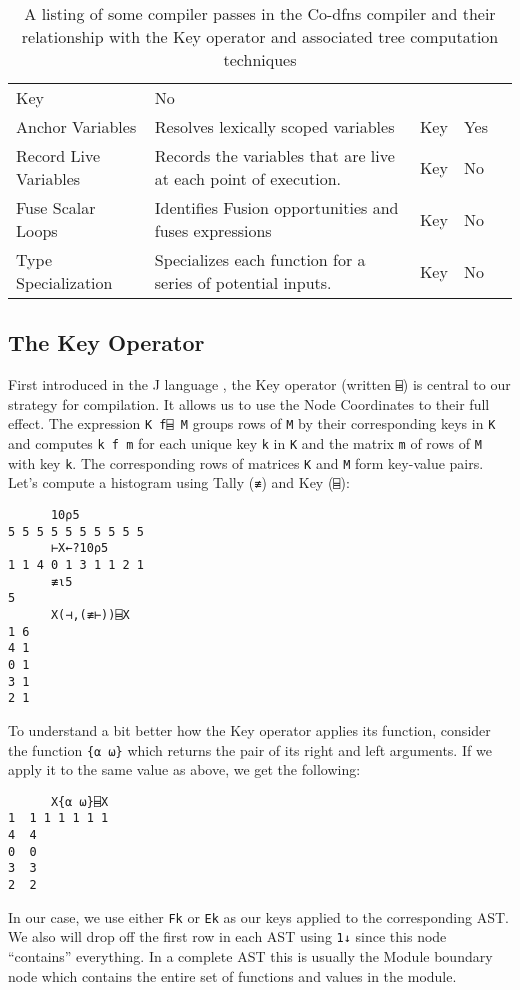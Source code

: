 \documentclass[numbers,preprint]{sigplanconf}
\begin{document}
\begin{table*}
\begin{tabular}{l p{2.8in} l l l}
 Key & No \\
Anchor Variables & Resolves lexically scoped variables &
 Key & Yes \\
Record Live Variables & Records the variables that are live at each point of 
 execution. & Key & No \\
Fuse Scalar Loops & Identifies Fusion opportunities and fuses expressions &
 Key & No \\
Type Specialization & Specializes each function for a series of potential inputs. 
 & Key & No \\
\end{tabular}
\caption{A listing of some compiler passes in the Co-dfns compiler and their 
 relationship with the Key operator and associated tree computation techniques}
\label{tab:passes}
\end{table*}

\subsection{The Key Operator}

First introduced in the J language \cite{hui2014key},
the Key operator (written \verb;⌸;) is central to our strategy for compilation.
It allows us to use the Node Coordinates to their full effect. 
The expression \verb;K f⌸ M; groups rows of \verb;M; by their corresponding 
keys in \verb;K; and computes \verb;k f m; for each unique key \verb;k; in 
\verb;K; and the matrix \verb;m; of rows of \verb;M; with key \verb;k;. 
The corresponding rows of matrices \verb;K; and \verb;M; form key-value pairs.
Let's compute a histogram using Tally (\verb;≢;) and Key (\verb;⌸;):

\begin{verbatim}
      10⍴5
5 5 5 5 5 5 5 5 5 5
      ⊢X←?10⍴5
1 1 4 0 1 3 1 1 2 1
      ≢⍳5
5
      X(⊣,(≢⊢))⌸X
1 6
4 1
0 1
3 1
2 1
\end{verbatim}

To understand a bit better how the Key operator applies its function,
consider the function \verb;{⍺ ⍵}; which returns the pair of its right
and left arguments. If we apply it to the same value as above, we
get the following:

\begin{verbatim}
      X{⍺ ⍵}⌸X
1  1 1 1 1 1 1 
4  4           
0  0           
3  3           
2  2
\end{verbatim}

In our case, we use either \verb;Fk; or \verb;Ek; as our keys applied to the
corresponding AST. We also will drop off the first row in each AST
using \verb;1↓; since this node ``contains'' everything. In a complete
AST this is usually the Module boundary node which contains the entire
set of functions and values in the module.
\end{document}
